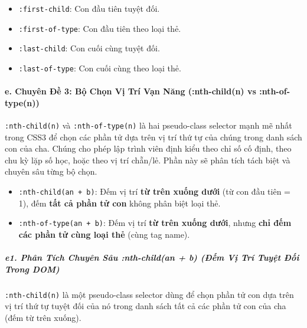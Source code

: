 \documentclass[11pt,oneside]{book}
\newcommand{\codeinline}[1]{\textcolor{accentOrange}{\texttt{#1}}}
\begin{document}
\begin{tipBox}
\begin{itemize}[leftmargin=1.5em, itemsep=3pt, parsep=0pt]
    \item \codeinline{:first-child}: Con đầu tiên tuyệt đối.
    \item \codeinline{:first-of-type}: Con đầu tiên theo loại thẻ.
    \item \codeinline{:last-child}: Con cuối cùng tuyệt đối.
    \item \codeinline{:last-of-type}: Con cuối cùng theo loại thẻ.
\end{itemize}
\end{tipBox}

\paragraph{e. Chuyên Đề 3: Bộ Chọn Vị Trí Vạn Năng (:nth-child(n) vs :nth-of-type(n))}

\codeinline{:nth-child(n)} và \codeinline{:nth-of-type(n)} là hai pseudo-class selector mạnh mẽ nhất trong CSS3 để chọn các phần tử dựa trên vị trí thứ tự của chúng trong danh sách con của cha. Chúng cho phép lập trình viên định kiểu theo chỉ số cố định, theo chu kỳ lặp số học, hoặc theo vị trí chẵn/lẻ. Phần này sẽ phân tích tách biệt và chuyên sâu từng bộ chọn.

\begin{conceptBox}
\begin{itemize}[leftmargin=1.5em, itemsep=3pt, parsep=0pt]
    \item \codeinline{:nth-child(an + b)}: Đếm vị trí \textbf{từ trên xuống dưới} (từ con đầu tiên = 1), đếm \textbf{tất cả phần tử con} không phân biệt loại thẻ.
    \item \codeinline{:nth-of-type(an + b)}: Đếm vị trí \textbf{từ trên xuống dưới}, nhưng \textbf{chỉ đếm các phần tử cùng loại thẻ} (cùng tag name).
\end{itemize}
\end{conceptBox}


\subparagraph{e1. Phân Tích Chuyên Sâu :nth-child(an + b) (Đếm Vị Trí Tuyệt Đối Trong DOM)}

\codeinline{:nth-child(n)} là một pseudo-class selector dùng để chọn phần tử con dựa trên vị trí thứ tự tuyệt đối của nó trong danh sách tất cả các phần tử con của cha (đếm từ trên xuống).
\end{document}
